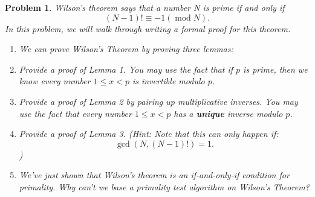 \documentclass[10pt]{article}
\newtheorem{problem}{\sc\color{cit}Problem}
\begin{document}
\newpage


\begin{problem}
Wilson’s theorem says that a number N is prime if and only if 
\[
    (N-1)!\equiv -1 (\operatorname{mod} N).
\]
In this problem, we will walk through writing a formal proof for this theorem. 
\begin{enumerate}
    \item[(a)] We can prove Wilson's Theorem by proving three lemmas:

    \item[(b)] Provide a proof of Lemma 1. You may use the fact that if $p$ is prime, then we know every number $1 \leq x < p$ is invertible modulo $p$.

    \item[(c)] Provide a proof of Lemma 2 by pairing up multiplicative inverses. You may use the fact that every number $1 \leq x < p$ has a \textbf{unique} inverse modulo $p$. 
    
    \item[(d)] Provide a proof of Lemma 3. (Hint: Note that this can only happen if: 
    \[
        \operatorname{gcd}(N, (N - 1)!) = 1.
    \]
    )

    \item[(e)] We've just shown that Wilson’s theorem is an if-and-only-if condition for primality. Why can't we base a primality test algorithm on Wilson's Theorem? 
\end{enumerate}

\end{problem}
\end{document}
